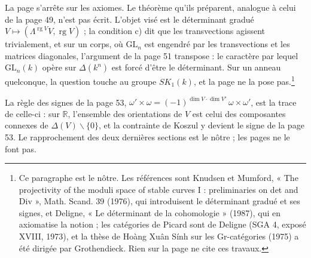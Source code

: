 \documentclass[11pt,a4paper]{article}
\begin{document}
La page s'arrête sur les axiomes. Le théorème qu'ils préparent, analogue à
celui de la page 49, n'est pas écrit. L'objet visé est le déterminant gradué
$V \mapsto (\Lambda^{\operatorname{rg} V} V, \operatorname{rg} V)$ ; la
condition c) dit que les transvections agissent trivialement, et sur un
corps, où $\mathrm{GL}_n$ est engendré par les transvections et les matrices
diagonales, l'argument de la page 51 transpose : le caractère par lequel
$\mathrm{GL}_n(k)$ opère sur $\Delta(k^n)$ est forcé d'être le déterminant.
Sur un anneau quelconque, la question touche au groupe $SK_1(k)$, et la page
ne la pose pas.\footnote{Ce paragraphe est le nôtre. Les références sont
Knudsen et Mumford, « The projectivity of the moduli space of stable curves
I : preliminaries on det and Div », Math. Scand. 39 (1976), qui
introduisent le déterminant gradué et ses signes, et Deligne, « Le
déterminant de la cohomologie » (1987), qui en axiomatise la notion ; les
catégories de Picard sont de Deligne (SGA 4, exposé XVIII, 1973), et la thèse
de Hoàng Xuân Sính sur les Gr-catégories (1975) a été dirigée par
Grothendieck. Rien sur la page ne cite ces travaux.}

La règle des signes de la page 53, $\omega' \times \omega =
(-1)^{\dim V \cdot \dim V'}\, \omega \times \omega'$, est la trace de celle-ci :
sur $\mathbb{R}$, l'ensemble des orientations de $V$ est celui des
composantes connexes de $\Delta(V) \smallsetminus \{0\}$, et la contrainte de
Koszul y devient le signe de la page 53. Le rapprochement des deux dernières
sections est le nôtre ; les pages ne le font pas.
\end{document}
